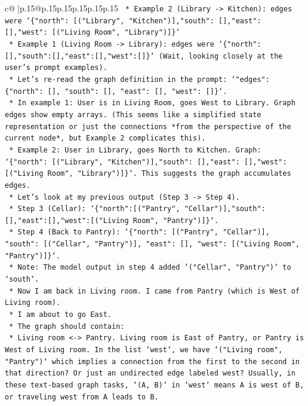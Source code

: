 \documentclass{article}
\begin{document}
{\begin{supertabular}{c@{$\;$}|p{.15\linewidth}@{}p{.15\linewidth}p{.15\linewidth}p{.15\linewidth}p{.15\linewidth}p{.15\linewidth}}
{{{\texttt{        *   Example 2 (Library {-}> Kitchen): edges were `\{"north": {[}("Library", "Kitchen"){]},"south": {[}{]},"east": {[}{]},"west": {[}("Living Room", "Library"){]}\}`} \\
\texttt{        *   Example 1 (Living Room {-}> Library): edges were `\{"north":{[}{]},"south":{[}{]},"east":{[}{]},"west":{[}{]}\}` (Wait, looking closely at the user's prompt examples).} \\
\texttt{        *   Let's re{-}read the graph definition in the prompt: `"edges":\{"north": {[}{]}, "south": {[}{]}, "east": {[}{]}, "west": {[}{]}\}`.} \\
\texttt{        *   In example 1: User is in Living Room, goes West to Library. Graph edges show empty arrays. (This seems like a simplified state representation or just the connections *from the perspective of the current node*, but Example 2 complicates this).} \\
\texttt{        *   Example 2: User in Library, goes North to Kitchen. Graph: `\{"north": {[}("Library", "Kitchen"){]},"south": {[}{]},"east": {[}{]},"west": {[}("Living Room", "Library"){]}\}`. This suggests the graph accumulates edges.} \\
\texttt{    *   Let's look at my previous output (Step 3 {-}> Step 4).} \\
\texttt{        *   Step 3 (Cellar): `\{"north":{[}("Pantry", "Cellar"){]},"south":{[}{]},"east":{[}{]},"west":{[}("Living Room", "Pantry"){]}\}`.} \\
\texttt{        *   Step 4 (Back to Pantry): `\{"north": {[}("Pantry", "Cellar"){]}, "south": {[}("Cellar", "Pantry"){]}, "east": {[}{]}, "west": {[}("Living Room", "Pantry"){]}\}`.} \\
\texttt{        *   Note: The model output in step 4 added `("Cellar", "Pantry")` to `south`.} \\
\texttt{    *   Now I am back in Living room. I came from Pantry (which is West of Living room).} \\
\texttt{    *   I am about to go East.} \\
\texttt{    *   The graph should contain:} \\
\texttt{        *   Living room <{-}> Pantry. Living room is East of Pantry, or Pantry is West of Living room. In the list `west`, we have `("Living room", "Pantry")` which implies a connection from the first to the second in that direction? Or just an undirected edge labeled west? Usually, in these text{-}based graph tasks, `(A, B)` in `west` means A is west of B, or traveling west from A leads to B.} \\
}}}
\end{supertabular}}
\end{document}
